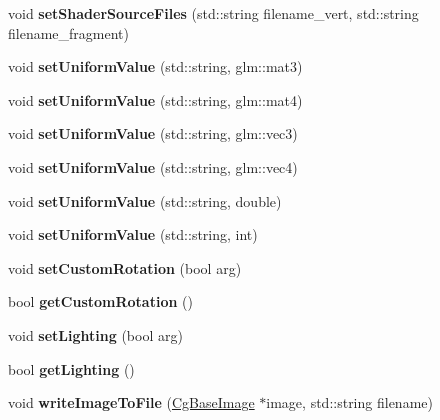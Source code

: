 \begin{DoxyCompactItemize}
void {\bfseries set\+Shader\+Source\+Files} (std\+::string filename\+\_\+vert, std\+::string filename\+\_\+fragment)
\item 
\mbox{\label{class_cg_qt_g_l_render_widget_a034c32d07bce4eed937c981ef42f9687}} 
void {\bfseries set\+Uniform\+Value} (std\+::string, glm\+::mat3)
\item 
\mbox{\label{class_cg_qt_g_l_render_widget_a357543816b424664474b913e47afde0c}} 
void {\bfseries set\+Uniform\+Value} (std\+::string, glm\+::mat4)
\item 
\mbox{\label{class_cg_qt_g_l_render_widget_acd7c513cfb218017ca578e4f44b7d508}} 
void {\bfseries set\+Uniform\+Value} (std\+::string, glm\+::vec3)
\item 
\mbox{\label{class_cg_qt_g_l_render_widget_a78ab082ccdfd69e7cf7173901f741aee}} 
void {\bfseries set\+Uniform\+Value} (std\+::string, glm\+::vec4)
\item 
\mbox{\label{class_cg_qt_g_l_render_widget_a72bf3e7247135ae13b068a32167d1dd5}} 
void {\bfseries set\+Uniform\+Value} (std\+::string, double)
\item 
\mbox{\label{class_cg_qt_g_l_render_widget_ac236b94ae85231a928ce6d79132b6fc7}} 
void {\bfseries set\+Uniform\+Value} (std\+::string, int)
\item 
\mbox{\label{class_cg_qt_g_l_render_widget_ac98514c13fef5798b7179abd77cdfb45}} 
void {\bfseries set\+Custom\+Rotation} (bool arg)
\item 
\mbox{\label{class_cg_qt_g_l_render_widget_a81be5ce4c07150d0b12dc35b512b4aa2}} 
bool {\bfseries get\+Custom\+Rotation} ()
\item 
\mbox{\label{class_cg_qt_g_l_render_widget_aa10879ec109e1b8d7b04a6a1cc20ec38}} 
void {\bfseries set\+Lighting} (bool arg)
\item 
\mbox{\label{class_cg_qt_g_l_render_widget_a47b7f7b5102348e33e80d84b775f65c1}} 
bool {\bfseries get\+Lighting} ()
\item 
\mbox{\label{class_cg_qt_g_l_render_widget_abd28f965fd424222b1c757d109b72979}} 
void {\bfseries write\+Image\+To\+File} (\hyperlink{class_cg_base_image}{Cg\+Base\+Image} $\ast$image, std\+::string filename)
\end{DoxyCompactItemize}
